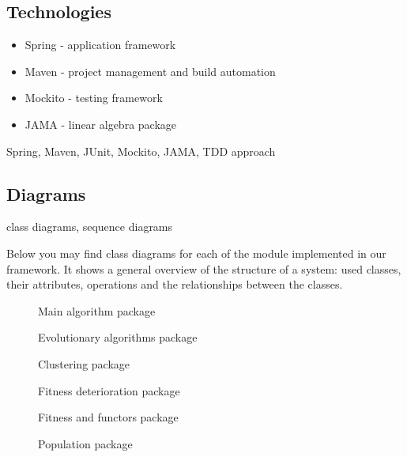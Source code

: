 \subsection{Technologies}
\begin{itemize}
  \item Spring \cite{spring} - application framework
  \item Maven \cite{maven} - project management and build automation
  \item Mockito \cite{mockito} - testing framework 
  \item JAMA \cite{jama} - linear algebra package
\end{itemize}
Spring, Maven, JUnit, Mockito, JAMA, TDD approach

\subsection{Diagrams}
class diagrams, sequence diagrams

Below you may find class diagrams for each of the module implemented in our
framework. It shows a general overview of the structure of a system: used
classes, their attributes, operations and the relationships between the classes.


\begin{figure}
  \centering
  \caption{Main algorithm package}
  \label{alg}
\end{figure}

\begin{figure}
  \centering
  \caption{Evolutionary algorithms package}
  \label{ea}
\end{figure}

\begin{figure}
  \centering
  \caption{Clustering package}
  \label{optics}
\end{figure}

\begin{figure}
  \centering
  \caption{Fitness deterioration package}
  \label{fitdet}
\end{figure}

\begin{figure}
  \centering
  \caption{Fitness and functors package}
  \label{ea}
\end{figure}

\begin{figure}
  \centering
  \caption{Population package}
  \label{ea}
\end{figure}